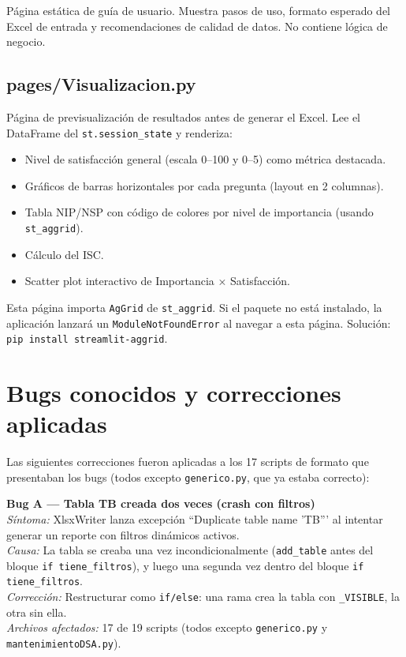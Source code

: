 \documentclass[12pt, letterpaper]{article}
\begin{document}
Página estática de guía de usuario. Muestra pasos de uso, formato esperado del Excel de entrada y recomendaciones de calidad de datos. No contiene lógica de negocio.

\subsection{pages/Visualizacion.py}

Página de previsualización de resultados antes de generar el Excel. Lee el DataFrame del \texttt{st.session\_state} y renderiza:

\begin{itemize}[leftmargin=1.5cm]
  \item Nivel de satisfacción general (escala 0--100 y 0--5) como métrica destacada.
  \item Gráficos de barras horizontales por cada pregunta (layout en 2 columnas).
  \item Tabla NIP/NSP con código de colores por nivel de importancia (usando \texttt{st\_aggrid}).
  \item Cálculo del ISC.
  \item Scatter plot interactivo de Importancia × Satisfacción.
\end{itemize}

\begin{notadev}
Esta página importa \texttt{AgGrid} de \texttt{st\_aggrid}. Si el paquete no está instalado, la aplicación lanzará un \texttt{ModuleNotFoundError} al navegar a esta página. Solución: \texttt{pip install streamlit-aggrid}.
\end{notadev}

\section{Bugs conocidos y correcciones aplicadas}

Las siguientes correcciones fueron aplicadas a los 17 scripts de formato que presentaban los bugs (todos excepto \texttt{generico.py}, que ya estaba correcto):

\begin{bugbox}
\textbf{Bug A — Tabla TB creada dos veces (crash con filtros)}\\[4pt]
\textit{Síntoma:} XlsxWriter lanza excepción ``Duplicate table name 'TB''' al intentar generar un reporte con filtros dinámicos activos.\\[4pt]
\textit{Causa:} La tabla se creaba una vez incondicionalmente (\texttt{add\_table} antes del bloque \texttt{if tiene\_filtros}), y luego una segunda vez dentro del bloque \texttt{if tiene\_filtros}.\\[4pt]
\textit{Corrección:} Restructurar como \texttt{if/else}: una rama crea la tabla con \texttt{\_VISIBLE}, la otra sin ella.\\[4pt]
\textit{Archivos afectados:} 17 de 19 scripts (todos excepto \texttt{generico.py} y \texttt{mantenimientoDSA.py}).
\end{bugbox}
\end{document}
